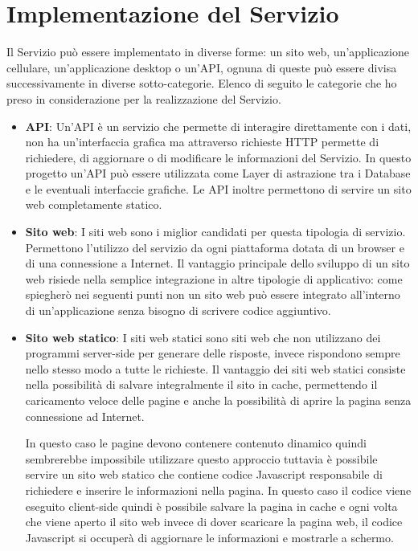 \section{Implementazione del Servizio}
Il Servizio pu\`o essere implementato in diverse forme: un sito web, un'applicazione cellulare, un'applicazione desktop o un'API\@, ognuna di queste pu\`o essere divisa successivamente in diverse sotto-categorie. Elenco di seguito le categorie che ho preso in considerazione per la realizzazione del Servizio.

\begin{itemize}
    \item \textbf{API}: Un'API \`e un servizio che permette di interagire direttamente con i dati, non ha un'interfaccia grafica ma attraverso richieste HTTP permette di richiedere, di aggiornare o di modificare le informazioni del Servizio. In questo progetto un'API pu\`o essere utilizzata come Layer di astrazione tra i Database e le eventuali interfaccie grafiche. Le API inoltre permettono di servire un sito web completamente statico.
    \item \textbf{Sito web}: I siti web sono i miglior candidati per questa tipologia di servizio. Permettono l'utilizzo del servizio da ogni piattaforma dotata di un browser e di una connessione a Internet. Il vantaggio principale dello sviluppo di un sito web risiede nella semplice integrazione in altre tipologie di applicativo: come spiegher\`o nei seguenti punti non un sito web pu\`o essere integrato all'interno di un'applicazione senza bisogno di scrivere codice aggiuntivo.
    \item \textbf{Sito web statico}: I siti web statici sono siti web che non utilizzano dei programmi server-side per generare delle risposte, invece rispondono sempre nello stesso modo a tutte le richieste. Il vantaggio dei siti web statici consiste nella possibilit\`a di salvare integralmente il sito in cache, permettendo il caricamento veloce delle pagine e anche la possibilit\`a di aprire la pagina senza connessione ad Internet.
    
    In questo caso le pagine devono contenere contenuto dinamico quindi sembrerebbe impossibile utilizzare questo approccio tuttavia \`e possibile servire un sito web statico che contiene codice Javascript responsabile di richiedere e inserire le informazioni nella pagina. In questo caso il codice viene eseguito client-side quindi \`e possibile salvare la pagina in cache e ogni volta che viene aperto il sito web invece di dover scaricare la pagina web, il codice Javascript si occuper\`a di aggiornare le informazioni e mostrarle a schermo.


\end{itemize}
